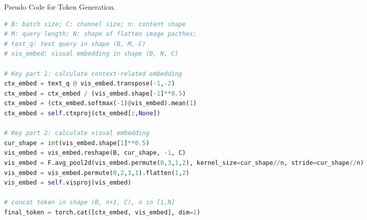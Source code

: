 \begin{algorithm}[t!]
\caption{Pseudo Code for Token Generation.}
\label{algo:code}
\begin{lstlisting}[language=python]
# B: batch size; C: channel size; n: content shape
# M: query length; N: shape of flatten image pacthes; 
# text_q: text query in shape (B, M, C)
# vis_embed: visual embedding in shape (B, N, C)

# Key part 1: calculate context-related embedding
ctx_embed = text_q @ vis_embed.transpose(-1,-2)
ctx_embed = ctx_embed / (vis_embed.shape[-1]**0.5)
ctx_embed = (ctx_embed.softmax(-1)@vis_embed).mean(1)
ctx_embed = self.ctxproj(ctx_embed[:,None])

# Key part 2: calculate visual embedding
cur_shape = int(vis_embed.shape[1]**0.5)
vis_embed = vis_embed.reshape(B, cur_shape, -1, C)
vis_embed = F.avg_pool2d(vis_embed.permute(0,3,1,2), kernel_size=cur_shape//n, stride=cur_shape//n)
vis_embed = vis_embed.permute(0,2,3,1).flatten(1,2)
vis_embed = self.visproj(vis_embed)

# concat token in shape (B, n+1, C), n in [1,N]
final_token = torch.cat([ctx_embed, vis_embed], dim=1)
\end{lstlisting}
\end{algorithm}

